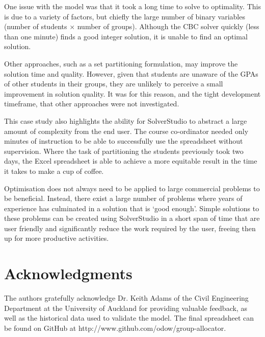\documentclass[12pt]{ORSNZ}
\begin{document}
One issue with the model was that it took a long time to solve to optimality. This is due to a variety of factors, but chiefly the large number of binary variables (number of students $\times$ number of groups). Although the CBC solver quickly (less than one minute) finds a good integer solution, it is unable to find an optimal solution. 




Other approaches, such as a set partitioning formulation, may improve the solution time and quality. However, given that students are unaware of the GPAs of other students in their groups, they are unlikely to perceive a small improvement in solution quality. It was for this reason, and the tight development timeframe, that other approaches were not investigated.

This case study also highlights the ability for SolverStudio to abstract a large amount of complexity from the end user. The course co-ordinator needed only minutes of instruction to be able to successfully use the spreadsheet without supervision. Where the task of partitioning the students previously took two days, the Excel spreadsheet is able to achieve a more equitable result in the time it takes to make a cup of coffee.

Optimisation does not always need to be applied to large commercial problems to be beneficial. Instead, there exist a large number of problems where years of experience has culminated in a solution that is `good enough'. Simple solutions to these problems can be created using SolverStudio in a short span of time that are user friendly and significantly reduce the work required by the user, freeing then up for more productive activities.

\section*{Acknowledgments}
The authors gratefully acknowledge Dr. Keith Adams of the Civil Engineering Department at the University of Auckland for providing valuable feedback, as well as the historical data used to validate the model. The final spreadsheet can be found on GitHub at http://www.github.com/odow/group-allocator.



\end{document}
